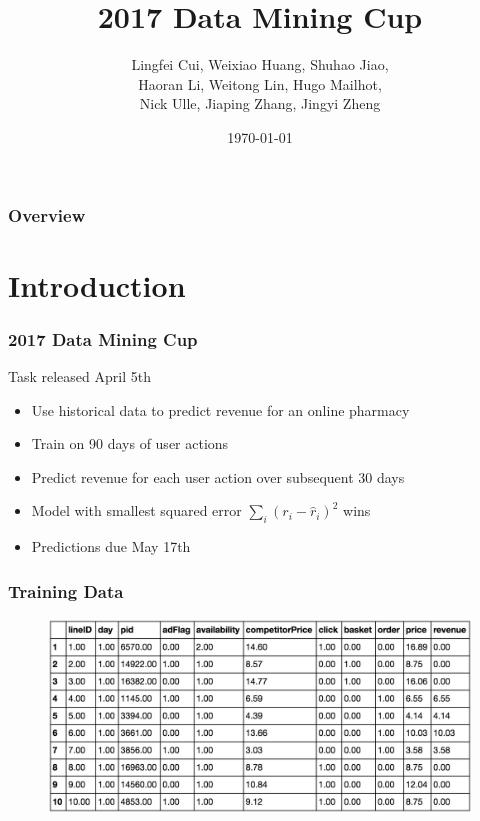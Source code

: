 \documentclass{beamer}
\title{2017 Data Mining Cup}
\author[2017 Team]{
  Lingfei Cui, \textcolor{lgray}{Weixiao Huang}, Shuhao Jiao,\\
  Haoran Li,   \textcolor{lgray}{Weitong Lin},   \textcolor{lgray}{Hugo Mailhot},\\
  Nick Ulle,   \textcolor{lgray}{Jiaping Zhang}, Jingyi Zheng
}
\institute[UC Davis]{University of California, Davis}
\date{\today}
\begin{document}
\begin{frame}
  \titlepage
\end{frame}

\begin{frame}
  \frametitle{Overview} %
  \tableofcontents
\end{frame}


\section{Introduction} %

\begin{frame}
  \frametitle{2017 Data Mining Cup}

  \begin{block}{Task released April 5th}
    \begin{itemize}
      \item Use historical data to predict revenue for an online pharmacy
      \item Train on 90 days of user actions
      \item Predict revenue for each user action over subsequent 30 days
      \item Model with smallest squared error $\sum_i (r_i - \hat{r}_i)^2$ wins
      \item Predictions due May 17th
      \end{itemize}
  \end{block}
\end{frame}

\begin{frame}
\frametitle{Training Data}
  \begin {figure}[H]
	\centering\includegraphics[scale=0.5]{graphics/dataexp.png}
	\end {figure}
\end{frame}
\end{document}
